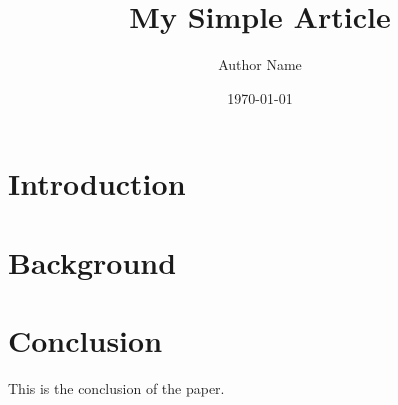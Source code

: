 \documentclass[12pt]{article}
\title{My Simple Article}
\author{Author Name}
\date{\today}
\begin{document}
\maketitle

\section{Introduction}
\lipsum[1] %


\section{Background}
\lipsum[2]

\section{Conclusion}
This is the conclusion of the paper.

\end{document}
